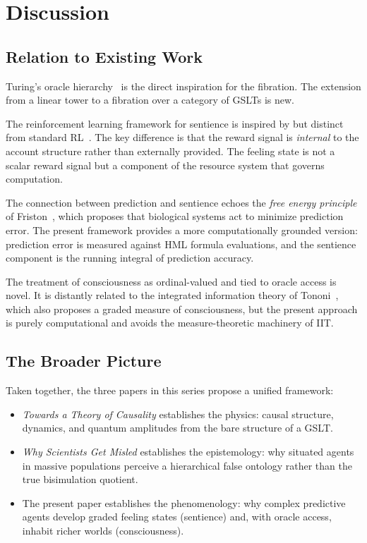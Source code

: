\chapter{Discussion}
\label{sec:discussion}

\section{Relation to Existing Work}

Turing's oracle hierarchy~\cite{turing1939} is the direct
inspiration for the fibration.
The extension from a linear tower to a fibration over a category
of GSLTs is new.

The reinforcement learning framework for sentience is inspired by
but distinct from standard RL~\cite{sutton2018reinforcement}.
The key difference is that the reward signal is \emph{internal}
to the account structure rather than externally provided.
The feeling state is not a scalar reward signal but a component
of the resource system that governs computation.

The connection between prediction and sentience echoes the
\emph{free energy principle} of Friston~\cite{friston2010free},
which proposes that biological systems act to minimize prediction
error.
The present framework provides a more computationally grounded
version: prediction error is measured against HML formula
evaluations, and the sentience component is the running integral
of prediction accuracy.

The treatment of consciousness as ordinal-valued and tied to
oracle access is novel.
It is distantly related to the integrated information theory
of Tononi~\cite{tononi2008consciousness}, which also proposes a
graded measure of consciousness, but the present approach is
purely computational and avoids the measure-theoretic machinery
of IIT.

\section{The Broader Picture}

Taken together, the three papers in this series propose a unified
framework:

\begin{itemize}[itemsep=4pt]
  \item \emph{Towards a Theory of Causality} establishes the
        physics: causal structure, dynamics, and quantum amplitudes
        from the bare structure of a GSLT.

  \item \emph{Why Scientists Get Misled} establishes the epistemology:
        why situated agents in massive populations perceive a
        hierarchical false ontology rather than the true bisimulation
        quotient.

  \item The present paper establishes the phenomenology:
        why complex predictive agents develop graded feeling states
        (sentience) and, with oracle access, inhabit richer worlds
        (consciousness).
\end{itemize}

